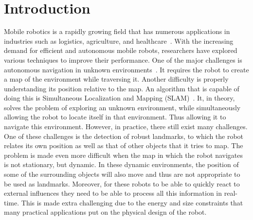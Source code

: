 \chapter{Introduction}\label{chapter:introduction}

Mobile robotics is a rapidly growing field that has numerous applications in industries such as logistics, agriculture, and healthcare~\cite{cognominal2021evolving,kebede2024review,clark2023amazon}. With the increasing demand for efficient and autonomous mobile robots, researchers have explored various techniques to improve their performance. One of the major challenges is autonomous navigation in unknown environments~\cite{alatise2020review}. It requires the robot to create a map of the environment while traversing it. Another difficulty is properly understanding its position relative to the map. An algorithm that is capable of doing this is Simultaneous Localization and Mapping (SLAM)~\cite{whyte1996slam,whyte2006slam}. It, in theory, solves the problem of exploring an unknown environment, while simultaneously allowing the robot to locate itself in that environment. Thus allowing it to navigate this environment. However, in practice, there still exist many challenges. One of these challenges is the detection of robust landmarks, to which the robot relates its own position as well as that of other objects that it tries to map. The problem is made even more difficult when the map in which the robot navigates is not stationary, but dynamic. In these dynamic environments, the position of some of the surrounding objects will also move and thus are not appropriate to be used as landmarks. Moreover, for these robots to be able to quickly react to external influences they need to be able to process all this information in real-time. This is made extra challenging due to the energy and size constraints that many practical applications put on the physical design of the robot.

